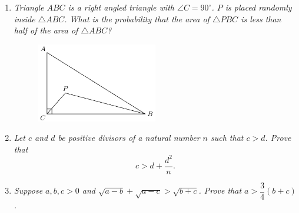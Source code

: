 \documentclass{article}
\begin{document}
\begin{enumerate}[1.]
\vspace{6pt}
\item %
{\itshape Triangle $ABC$ is a right angled triangle with $\angle C = 90^{\circ}$. $P$ is placed randomly inside $\triangle ABC$. What is the probability that the area of $\triangle PBC$ is less than half of the area of $\triangle ABC$?
\begin{figure}[h]
\centering
\includegraphics[width=0.5\textwidth]{../fig.jpg}
\end{figure}}


\vspace{6pt}
\item %
{\itshape Let $c$ and $d$ be positive divisors of a natural number $n$ such that $c > d$. Prove that $$c > d + \frac{d^2}{n}.$$}


\vspace{6pt}
\item %
{\itshape Suppose $a,b,c > 0$ and $\sqrt{a-b} +\sqrt{a-c} > \sqrt{b+c}$. Prove that $a > \dfrac{3}{4} (b+c)$.}


\end{enumerate}
\end{document}
